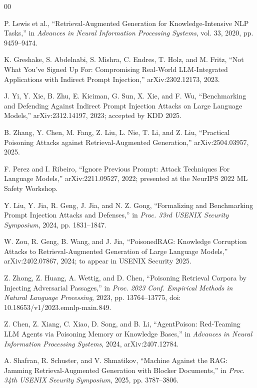 \begin{thebibliography}{00}

 P. Lewis et al., ``Retrieval-Augmented Generation for Knowledge-Intensive NLP Tasks,'' in \textit{Advances in Neural Information Processing Systems}, vol. 33, 2020, pp. 9459--9474.

 K. Greshake, S. Abdelnabi, S. Mishra, C. Endres, T. Holz, and M. Fritz, ``Not What You've Signed Up For: Compromising Real-World LLM-Integrated Applications with Indirect Prompt Injection,'' arXiv:2302.12173, 2023.

 J. Yi, Y. Xie, B. Zhu, E. Kiciman, G. Sun, X. Xie, and F. Wu, ``Benchmarking and Defending Against Indirect Prompt Injection Attacks on Large Language Models,'' arXiv:2312.14197, 2023; accepted by KDD 2025.

 B. Zhang, Y. Chen, M. Fang, Z. Liu, L. Nie, T. Li, and Z. Liu, ``Practical Poisoning Attacks against Retrieval-Augmented Generation,'' arXiv:2504.03957, 2025.

 F. Perez and I. Ribeiro, ``Ignore Previous Prompt: Attack Techniques For Language Models,'' arXiv:2211.09527, 2022; presented at the NeurIPS 2022 ML Safety Workshop.

 Y. Liu, Y. Jia, R. Geng, J. Jia, and N. Z. Gong, ``Formalizing and Benchmarking Prompt Injection Attacks and Defenses,'' in \textit{Proc. 33rd USENIX Security Symposium}, 2024, pp. 1831--1847.

 W. Zou, R. Geng, B. Wang, and J. Jia, ``PoisonedRAG: Knowledge Corruption Attacks to Retrieval-Augmented Generation of Large Language Models,'' arXiv:2402.07867, 2024; to appear in USENIX Security 2025.

 Z. Zhong, Z. Huang, A. Wettig, and D. Chen, ``Poisoning Retrieval Corpora by Injecting Adversarial Passages,'' in \textit{Proc. 2023 Conf. Empirical Methods in Natural Language Processing}, 2023, pp. 13764--13775, doi: 10.18653/v1/2023.emnlp-main.849.

 Z. Chen, Z. Xiang, C. Xiao, D. Song, and B. Li, ``AgentPoison: Red-Teaming LLM Agents via Poisoning Memory or Knowledge Bases,'' in \textit{Advances in Neural Information Processing Systems}, 2024, arXiv:2407.12784.

 A. Shafran, R. Schuster, and V. Shmatikov, ``Machine Against the RAG: Jamming Retrieval-Augmented Generation with Blocker Documents,'' in \textit{Proc. 34th USENIX Security Symposium}, 2025, pp. 3787--3806.


\end{thebibliography}
